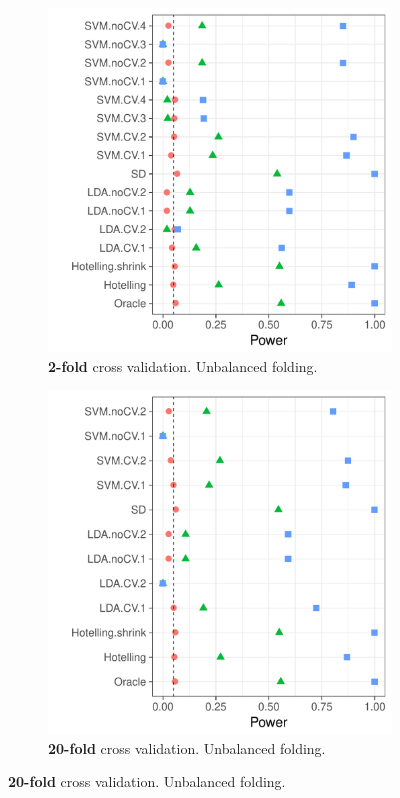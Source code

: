 \documentclass[12pt,a4paper]{article}
\begin{document}
\begin{figure}[h]
\centering
\caption{\mycaption}	
\label{fig:n_folds_unbalanced}
	\begin{subfigure}{.5\textwidth}
	  \centering
	  \includegraphics[width=1\linewidth]{"art/file5"}
	  \caption{\textbf{2-fold} cross validation. Unbalanced folding.} 
	\label{fig:n_folds_unbalanced_1}
	\end{subfigure}%
	\begin{subfigure}{.5\textwidth}
	  \centering
	  \includegraphics[width=1\linewidth]{"art/file7"}
	  \caption{\textbf{20-fold} cross validation. Unbalanced folding.} 
	\label{fig:n_folds_unbalanced_2}
	\end{subfigure}
\end{figure}
\end{document}
